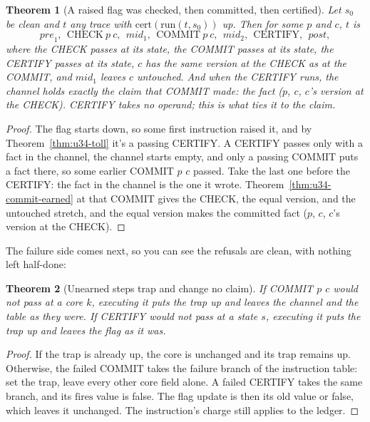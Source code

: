 \documentclass[11pt,twoside]{article}
\theoremstyle{thielethm}
\newtheorem{theorem}{Theorem}[section]
\theoremstyle{thieledef}
\theoremstyle{thieledef}
\theoremstyle{thieledef}
\theoremstyle{thielethm}
\theoremstyle{thieleobs}
\theoremstyle{thielethm}
\begin{document}
\begin{theorem}[A raised flag was checked, then committed, then certified]\label{thm:u34-cert-earned}
Let $s_0$ be clean and $t$ any trace with $\mathrm{cert}(\mathrm{run}(t, s_0))$ up. Then
for some $p$ and $c$, $t$ is
\[
\mathit{pre}_1,\ \ \mathrm{CHECK}\ p\ c,\ \ \mathit{mid}_1,\ \ \mathrm{COMMIT}\ p\ c,\ \ \mathit{mid}_2,\ \ \mathrm{CERTIFY},\ \ \mathit{post},
\]
where the CHECK passes at its state, the COMMIT passes at its state, the CERTIFY passes at
its state, $c$ has the same version at the CHECK as at the COMMIT, and $\mathit{mid}_1$ leaves
$c$ untouched. And when the CERTIFY runs, the channel holds exactly the claim that COMMIT made:
the fact ($p$, $c$, $c$'s version at the CHECK). CERTIFY takes no operand; this is what ties it
to the claim.
\end{theorem}

\begin{proof}
The flag starts down, so some first instruction raised it, and by
Theorem~\ref{thm:u34-toll} it's a passing CERTIFY. A CERTIFY passes only with a fact in the
channel, the channel starts empty, and only a passing COMMIT puts a fact there, so some
earlier COMMIT $p$ $c$ passed. Take the last one before the CERTIFY: the fact in the channel
is the one it wrote. Theorem~\ref{thm:u34-commit-earned} at that COMMIT gives the
CHECK, the equal version, and the untouched stretch, and the equal version makes the
committed fact ($p$, $c$, $c$'s version at the CHECK).
\end{proof}

The failure side comes next, so you can see the refusals are clean, with nothing left half-done:

\begin{theorem}[Unearned steps trap and change no claim]\label{thm:u34-failures}
If COMMIT $p$ $c$ would not pass at a core $k$, executing it puts the trap up and leaves the
channel and the table as they were. If CERTIFY would not pass at a state $s$, executing it
puts the trap up and leaves the flag as it was.
\end{theorem}

\begin{proof}
If the trap is already up, the core is unchanged and its trap remains up. Otherwise,
the failed COMMIT takes the failure branch of the instruction table: set the trap,
leave every other core field alone. A failed CERTIFY takes the same branch, and its
$\mathrm{fires}$ value is false. The flag update is then its old value or false,
which leaves it unchanged. The instruction's charge still applies to the ledger.
\end{proof}
\end{document}
